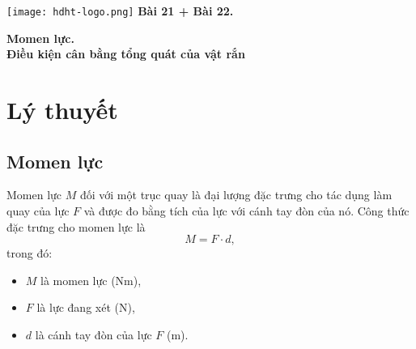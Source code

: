\newcommand{\chapter}[2][]{
	\newcommand{\chapname}{#2}
	\begin{flushleft}
		\begin{minipage}[t]{\linewidth}
			\texttt{[image: hdht-logo.png]}
			\hspace{0pt}	
			\sffamily\bfseries\large Bài  21 + Bài 22.
			\begin{flushleft}
				\LARGE\bfseries #1
			\end{flushleft}
		\end{minipage}
	\end{flushleft}
	\vspace{1cm}
	\normalfont\normalsize
}
\chapter[Momen lực. \\Điều kiện cân bằng tổng quát của vật rắn ]{Momen lực. Điều kiện cân bằng tổng quát của vật rắn }
\section{Lý thuyết}

\subsection{Momen lực}
Momen lực $M$ đối với một trục quay là đại lượng đặc trưng cho tác dụng làm quay của lực $F$ và được đo bằng tích của lực với cánh tay đòn của nó. Công thức đặc trưng cho momen lực là 
\begin{equation*}
	M = F\cdot d, \label{eq1}
\end{equation*}
trong đó: 
\begin{itemize}
	\item $M$ là momen lực ($\textrm{Nm}$), 
	\item $F$ là lực đang xét ($\textrm{N}$),
	\item $d$ là cánh tay đòn của lực $F$ ($\textrm{m}$).
\end{itemize}

